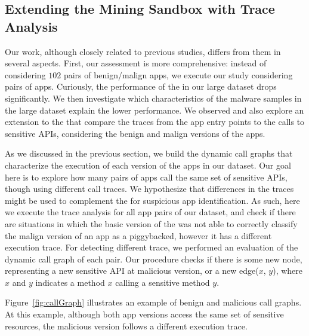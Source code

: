 
\subsection{Extending the Mining Sandbox with Trace Analysis}

Our work, although closely related to previous studies, differs from them in several aspects.  First, our assessment is more comprehensive: instead of considering $102$ pairs of benign/malign apps, we execute our study considering \apps pairs of apps. Curiously, the performance of the \mas in our large dataset drops significantly. We then investigate which characteristics of the malware samples in the large dataset explain the lower performance. We observed and also explore an extension to the \mas that compare the traces from the app entry points to the calls to sensitive APIs, considering the benign and malign versions of the apps. 

As we discussed in the previous section, we build the dynamic call graphs that characterize the execution of each version of the apps in our dataset. Our goal
here is to explore how many pairs of apps call the same set of sensitive APIs, though using different call
traces. We hypothesize that differences in the traces might be used to complement the \mas for suspicious app identification. As such, here we execute the trace analysis for all app pairs of our dataset, and check if there are situations in which the basic version of the \mas was not able to correctly classify the malign version of an app as a piggybacked, however it has a different execution trace. For detecting different trace, we performed an evaluation of the dynamic call graph of each pair. Our procedure checks if there is some new node, representing a new sensitive API at malicious version, or a new edge($x$, $y$), where $x$ and $y$ indicates a method $x$ calling a sensitive method $y$.

Figure~\ref{fig:callGraph} illustrates an example of benign and malicious call graphs.
At this example, although both app versions access the same set of sensitive resources, the
malicious version follows a different execution trace. 



